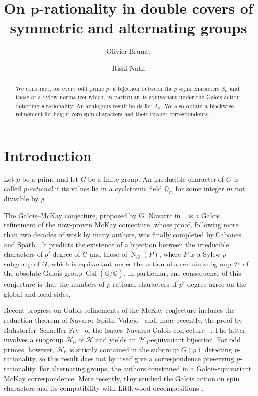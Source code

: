 \documentclass[reqno]{amsart}
\title[]
{On $\boldsymbol{p}$-rationality in double covers of
symmetric and alternating groups}
\author{Olivier Brunat}
\author{Rishi Nath}
\theoremstyle{definition}
\begin{document}
 
\maketitle


\begin{abstract} 
We construct, for every odd prime $p$, a bijection between the $p'$-spin
characters $\widetilde S_n$ and those of a Sylow normalizer which, in
particular, is equivariant under the Galois action detecting
$p$-rationality. An analogous result holds for $\widetilde A_n$. We also
obtain a blockwise refinement for height-zero spin characters and their
Brauer correspondents. 
%  
\end{abstract} 



\section{Introduction}

Let $p$ be a prime and let $G$ be a finite group. An irreducible character
of $G$ is called \emph{$p$-rational} if its values lie in a cyclotomic
field $\mathbb Q_m$ for some integer $m$ not divisible by $p$. 

The Galois--McKay conjecture, proposed by G. Navarro
in~\cite{NavarroGalois}, is a Galois refinement of the now-proven McKay
conjecture, whose proof, following more than two decades of work by many
authors, was finally completed by Cabanes and Sp\"ath \cite{CabSpath}. 
It predicts the existence of a bijection between the irreducible
characters of $p'$-degree of $G$ and those of $\operatorname{N}_G(P)$,
where $P$ is a Sylow $p$-subgroup of $G$, which is equivariant under the
action of a certain subgroup $\mathcal H$ of the absolute Galois group
$\operatorname{Gal}(\overline{\mathbb{Q}}/\mathbb{Q})$. 
In particular, one consequence of this conjecture is that the numbers of
$p$-rational characters of $p'$-degree agree on the global and local
sides.

Recent progress on Galois refinements of the McKay conjecture includes the
reduction theorem of Navarro--Sp\"ath--Vallejo~\cite{NavarroSpaethVallejo}
and, more recently, the proof by Ruhstorfer--Schaeffer
Fry~\cite{RuhstorferSchaefferFry} of the Isaacs--Navarro Galois
conjecture~\cite{IsaacsNavarro2002} . The latter involves a subgroup
$\mathcal H_0$ of $\mathcal H$ and yields an $\mathcal H_0$-equivariant
bijection. For odd primes, however, $\mathcal H_0$ is strictly contained
in the subgroup $G(p)$ detecting $p$-rationality, so this result does not
by itself give a correspondence preserving $p$-rationality.
For alternating groups, the authors construted in  \cite{BrNa} a
Galois-equivariant McKay correspondence. More recently, they studied the
Galois action on spin characters and its compatibility with Littlewood
decompositions \cite{BrNaMZ}.
\end{document}
